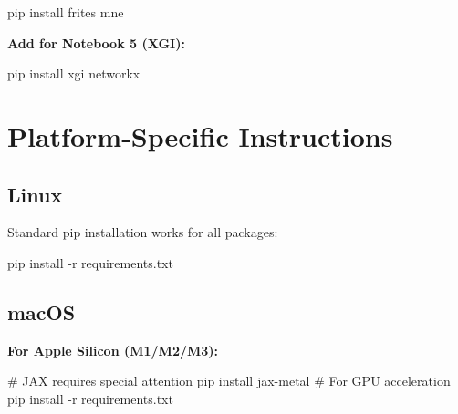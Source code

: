 \documentclass[
  11pt,
  letterpaper,
  oneside,
  openany]{book}
\newenvironment{Shaded}{\begin{snugshade}}{\end{snugshade}}
\newcommand{\AttributeTok}[1]{\textcolor[rgb]{0.40,0.45,0.13}{#1}}
\newcommand{\CommentTok}[1]{\textcolor[rgb]{0.37,0.37,0.37}{#1}}
\newcommand{\ExtensionTok}[1]{\textcolor[rgb]{0.00,0.23,0.31}{#1}}
\newcommand{\NormalTok}[1]{\textcolor[rgb]{0.00,0.23,0.31}{#1}}
\begin{document}
\begin{Shaded}
\begin{Highlighting}[]
\ExtensionTok{pip}\NormalTok{ install frites mne}
\end{Highlighting}
\end{Shaded}

\textbf{Add for Notebook 5 (XGI):}

\begin{Shaded}
\begin{Highlighting}[]
\ExtensionTok{pip}\NormalTok{ install xgi networkx}
\end{Highlighting}
\end{Shaded}

\section*{Platform-Specific
Instructions}\label{platform-specific-instructions}


\subsection*{Linux}\label{linux}

Standard pip installation works for all packages:

\begin{Shaded}
\begin{Highlighting}[]
\ExtensionTok{pip}\NormalTok{ install }\AttributeTok{{-}r}\NormalTok{ requirements.txt}
\end{Highlighting}
\end{Shaded}

\subsection*{macOS}\label{macos}

\textbf{For Apple Silicon (M1/M2/M3):}

\begin{Shaded}
\begin{Highlighting}[]
\CommentTok{\# JAX requires special attention}
\ExtensionTok{pip}\NormalTok{ install jax{-}metal  }\CommentTok{\# For GPU acceleration}
\ExtensionTok{pip}\NormalTok{ install }\AttributeTok{{-}r}\NormalTok{ requirements.txt}
\end{Highlighting}
\end{Shaded}
\end{document}
